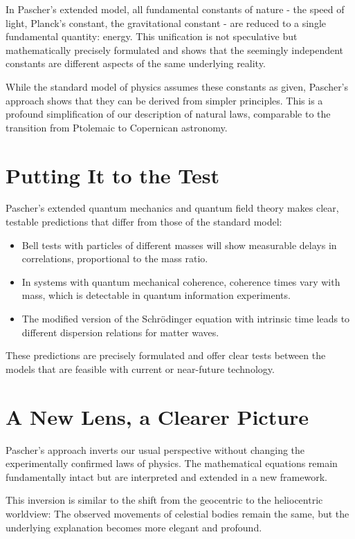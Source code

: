 \documentclass[a4paper,12pt]{article}
\begin{document}
	In Pascher's extended model, all fundamental constants of nature - the speed of light, Planck's constant, the gravitational constant - are reduced to a single fundamental quantity: energy. This unification is not speculative but mathematically precisely formulated and shows that the seemingly independent constants are different aspects of the same underlying reality.
	
	While the standard model of physics assumes these constants as given, Pascher's approach shows that they can be derived from simpler principles. This is a profound simplification of our description of natural laws, comparable to the transition from Ptolemaic to Copernican astronomy.
	
	\section{Putting It to the Test}
	
	Pascher's extended quantum mechanics and quantum field theory makes clear, testable predictions that differ from those of the standard model:
	
	\begin{itemize}
		\item Bell tests with particles of different masses will show measurable delays in correlations, proportional to the mass ratio.
		\item In systems with quantum mechanical coherence, coherence times vary with mass, which is detectable in quantum information experiments.
		\item The modified version of the Schrödinger equation with intrinsic time leads to different dispersion relations for matter waves.
	\end{itemize}
	
	These predictions are precisely formulated and offer clear tests between the models that are feasible with current or near-future technology.
	
	\section{A New Lens, a Clearer Picture}
	
	Pascher's approach inverts our usual perspective without changing the experimentally confirmed laws of physics. The mathematical equations remain fundamentally intact but are interpreted and extended in a new framework.
	
	This inversion is similar to the shift from the geocentric to the heliocentric worldview: The observed movements of celestial bodies remain the same, but the underlying explanation becomes more elegant and profound.
	
\end{document}
